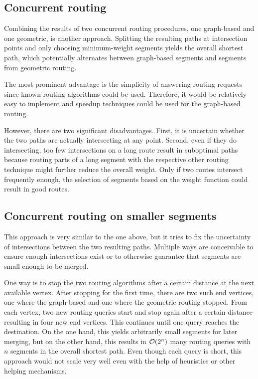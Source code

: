 	\subsection{Concurrent routing}
	
		Combining the results of two concurrent routing procedures, one graph-based and one geometric, is another approach.
		Splitting the resulting paths at intersection points and only choosing minimum-weight segments yields the overall shortest path, which potentially alternates between graph-based segments and segments from geometric routing.
		
		The most prominent advantage is the simplicity of answering routing requests since known routing algorithms could be used.
		Therefore, it would be relatively easy to implement and speedup techniques could be used for the graph-based routing.
		
		However, there are two significant disadvantages.
		First, it is uncertain whether the two paths are actually intersecting at any point.
		Second, even if they do intersecting, too few intersections on a long route result in suboptimal paths because routing parts of a long segment with the respective other routing technique might further reduce the overall weight.
		Only if two routes intersect frequently enough, the selection of segments based on the weight function could result in good routes.
	
	\subsection{Concurrent routing on smaller segments}
	
		This approach is very similar to the one above, but it tries to fix the uncertainty of intersections between the two resulting paths.
		Multiple ways are conceivable to ensure enough intersections exist or to otherwise guarantee that segments are small enough to be merged.
		
		One way is to stop the two routing algorithms after a certain distance at the next available vertex.
		After stopping for the first time, there are two such end vertices, one where the graph-based and one where the geometric routing stopped.
		From each vertex, two new routing queries start and stop again after a certain distance resulting in four new end vertices.
		This continues until one query reaches the destination.
		On the one hand, this yields arbitrarily small segments for later merging, but on the other hand, this results in $\mathcal{O}(2^n)$ many routing queries with $n$ segments in the overall shortest path.
		Even though each query is short, this approach would not scale very well even with the help of heuristics or other helping mechanisms.
		
